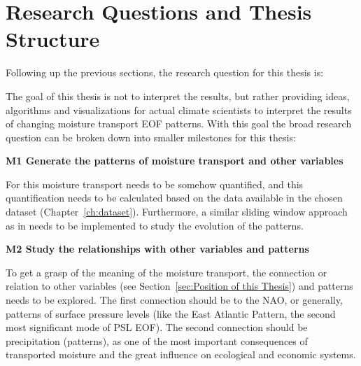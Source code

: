 \section{Research Questions and Thesis Structure}
\label{sec:research_questions}

Following up the previous sections, the research question for this thesis is: 

\begin{center}
\end{center}

The goal of this thesis is not to interpret the results, but rather providing ideas, algorithms and visualizations for actual climate scientists to interpret the results of changing moisture transport EOF patterns. 
With this goal the broad research question can be broken down into smaller milestones for this thesis: 

\textbf{M1 Generate the patterns of moisture transport and other variables}

For this moisture transport needs to be somehow quantified, and this quantification needs to be calculated based on the data available in the chosen dataset (Chapter~\ref{ch:dataset}). 
Furthermore, a similar sliding window approach as in \cite{vietinghoff_visual_2021} needs to be implemented to study the evolution of the patterns.

\textbf{M2 Study the relationships with other variables and patterns}

To get a grasp of the meaning of the moisture transport, the connection or relation to other variables (see Section~\ref{sec:Position of this Thesis}) and patterns needs to be explored. 
The first connection should be to the NAO, or generally, patterns of surface pressure levels (like the East Atlantic Pattern, the second most significant mode of PSL EOF). 
The second connection should be precipitation (patterns), as one of the most important consequences of transported moisture and the great influence on ecological and economic systems. 


